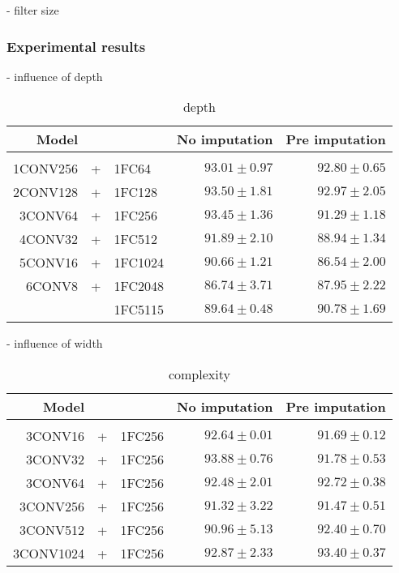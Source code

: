 - filter size

\subsubsection{Experimental results}




- influence of depth

\begin{table}[!htbp]
  \centering
   \begin{tabular}{rclrr}
   Model&&                  & No imputation         & Pre imputation             \\[0.2cm]
   \hline \\[-0.2cm]
    1CONV256 &+& 1FC64   	 & $93.01 \pm 0.97$ 	 & $92.80 \pm 0.65$\\
    2CONV128 &+& 1FC128  	 & $93.50 \pm 1.81$ 	 & $\mathbf{92.97 \pm 2.05}$\\
    3CONV64 &+& 1FC256   	 & $\mathbf{93.45 \pm 1.36}$ 	 & $91.29 \pm 1.18$\\
    4CONV32 &+& 1FC512   	 & $91.89 \pm 2.10$ 	 & $88.94 \pm 1.34$\\
    5CONV16 &+& 1FC1024  	 & $90.66 \pm 1.21$ 	 & $86.54 \pm 2.00$\\
    6CONV8 &+& 1FC2048   	 & $86.74 \pm 3.71$ 	 & $87.95 \pm 2.22$\\
    &&1FC5115          	 & $89.64 \pm 0.48$ 	 & $90.78 \pm 1.69$\\
   \end{tabular}
   \caption{depth}
 \end{table}

 - influence of width

 \begin{table}[!htbp]
  \centering
   \begin{tabular}{rclrr}
   Model&&                  & No imputation         & Pre imputation             \\[0.2cm]
   \hline \\[-0.2cm]
    3CONV16 &+& 1FC256    	 & $92.64 \pm 0.01$ 	 & $91.69 \pm 0.12$\\
    3CONV32 &+& 1FC256    	 & $\mathbf{93.88 \pm 0.76}$ 	 & $91.78 \pm 0.53$\\
    3CONV64 &+& 1FC256    	 & $92.48 \pm 2.01$ 	 & $92.72 \pm 0.38$\\
    3CONV256 &+& 1FC256   	 & $91.32 \pm 3.22$ 	 & $91.47 \pm 0.51$\\
    3CONV512 &+& 1FC256   	 & $90.96 \pm 5.13$ 	 & $92.40 \pm 0.70$\\
    3CONV1024 &+& 1FC256  	 & $92.87 \pm 2.33$ 	 & $\mathbf{93.40 \pm 0.37}$\\
   \end{tabular}
   \caption{complexity}
 \end{table}

